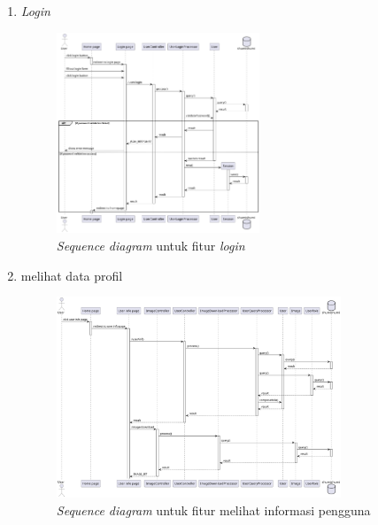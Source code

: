 \documentclass[a4paper]{article}
\begin{document}
\begin{enumerate}
\begin{enumerate}
        \item \textit{Login}\\
        \begin{figure}[h]
            \centering
            \includegraphics*[height=6cm]{diagram/sequence diagram/3. login/login.png}
            \caption{\textit{Sequence diagram} untuk fitur \textit{login}}
        \end{figure}
        \item melihat data profil\\
        \begin{figure}[h]
            \centering
            \includegraphics*[height=6cm]{diagram/sequence diagram/4. see user info/see user info.png}
            \caption{\textit{Sequence diagram} untuk fitur melihat informasi pengguna}
        \end{figure}
        \newpage


\end{enumerate}
\end{enumerate}
\end{document}

